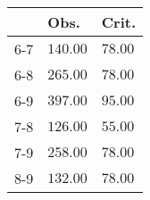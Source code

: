 \begin{table}[ht]
\centering
\begin{tabular}{rll}
  \hline
 & Obs. & Crit. \\ 
  \hline
6-7 & \(\mathbf{140.00}\) & \(\mathbf{78.00}\) \\ 
  6-8 & \(\mathbf{265.00}\) & \(\mathbf{78.00}\) \\ 
  6-9 & \(\mathbf{397.00}\) & \(\mathbf{95.00}\) \\ 
  7-8 & \(\mathbf{126.00}\) & \(\mathbf{55.00}\) \\ 
  7-9 & \(\mathbf{258.00}\) & \(\mathbf{78.00}\) \\ 
  8-9 & \(\mathbf{132.00}\) & \(\mathbf{78.00}\) \\ 
   \hline
\end{tabular}
\end{table}
